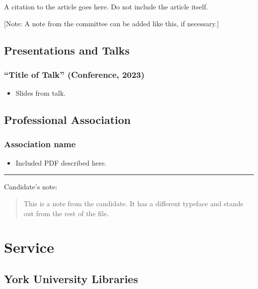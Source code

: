 \documentclass[12pt,oneside]{book}
\newcommand{\candidatenote}[1] {%
\par\noindent\rule{\textwidth}{1pt}
{\large Candidate's note:}
\begin{quote}
  \fontfamily{phv}\selectfont
  {\small #1}
\end{quote}
}
\begin{document}
A citation to the article goes here.  Do not include the article itself.

\vspace{\baselineskip}

[Note: A note from the committee can be added like this, if necessary.]

\newpage

\section{Presentations and Talks}

\subsection{``Title of Talk'' (Conference, 2023)}

\begin{itemize}
  \item Slides from talk.
\end{itemize}


\section{Professional Association}

\subsection{Association name}

\begin{itemize}
  \item Included PDF described here.
\end{itemize}

\candidatenote{
  This is a note from the candidate.  It has a different typeface and stands out from the rest of the file.
}



\renewcommand\thechapter{C}
\chapter{Service}

\section{York University Libraries}
\end{document}
